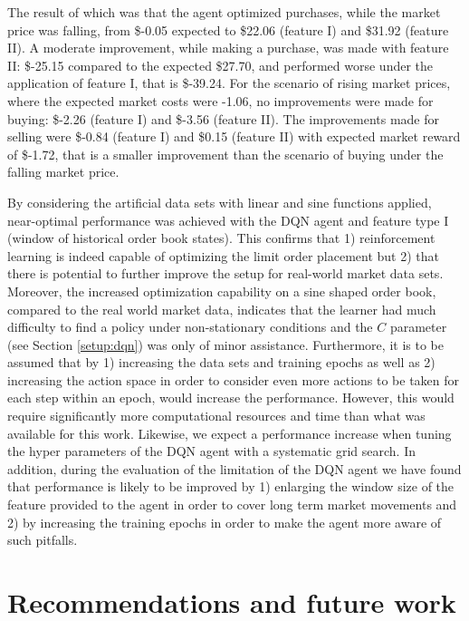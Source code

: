     The result of which was that the agent optimized purchases, while the market price was falling, from \$-0.05 expected to \$22.06 (feature I) and \$31.92 (feature II).
    A moderate improvement, while making a purchase, was made with feature II: \$-25.15 compared to the expected \$27.70, and performed worse under the application of feature I, that is \$-39.24.
    For the scenario of rising market prices, where the expected market costs were -1.06, no improvements were made for buying: \$-2.26 (feature I) and \$-3.56 (feature II).
    The improvements made for selling were \$-0.84 (feature I) and \$0.15 (feature II) with expected market reward of \$-1.72, that is a smaller improvement than the scenario of buying under the falling market price.
    
    By considering the artificial data sets with linear and sine functions applied, near-optimal performance was achieved with the DQN agent and feature type I (window of historical order book states).
    This confirms that 1) reinforcement learning is indeed capable of optimizing the limit order placement but 2) that there is potential to further improve the setup for real-world market data sets.
    Moreover, the increased optimization capability on a sine shaped order book, compared to the real world market data, indicates that the learner had much difficulty to find a policy under non-stationary conditions and the $C$ parameter (see Section \ref{setup:dqn}) was only of minor assistance.
    Furthermore, it is to be assumed that by 1) increasing the data sets and training epochs as well as 2) increasing the action space in order to consider even more actions to be taken for each step within an epoch, would increase the performance.
    However, this would require significantly more computational resources and time than what was available for this work.
    Likewise, we expect a performance increase when tuning the hyper parameters of the DQN agent with a systematic grid search.
    In addition, during the evaluation of the limitation of the DQN agent we have found that performance is likely to be improved by 1) enlarging the window size of the feature provided to the agent in order to cover long term market movements and 2) by increasing the training epochs in order to make the agent more aware of such pitfalls.

\section{Recommendations and future work}

